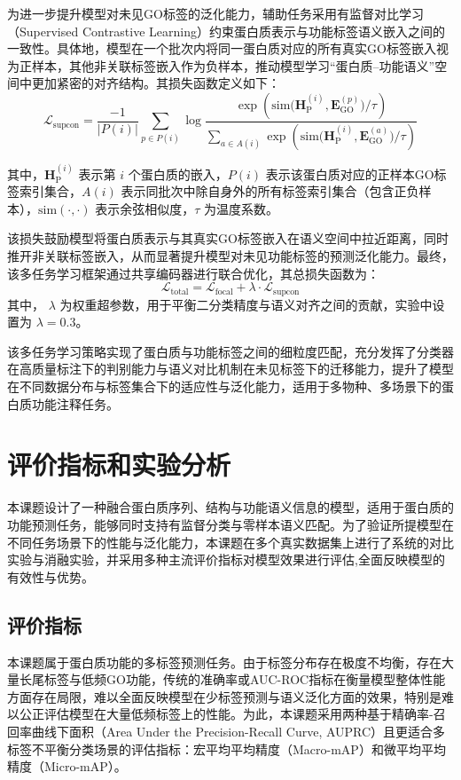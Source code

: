 为进一步提升模型对未见GO标签的泛化能力，辅助任务采用有监督对比学习（Supervised Contrastive Learning）约束蛋白质表示与功能标签语义嵌入之间的一致性。具体地，模型在一个批次内将同一蛋白质对应的所有真实GO标签嵌入视为正样本，其他非关联标签嵌入作为负样本，推动模型学习“蛋白质–功能语义”空间中更加紧密的对齐结构。其损失函数定义如下：
\begin{equation}
\mathcal{L}_{\mathrm{supcon}} = \frac{-1}{|P(i)|} \sum_{p \in P(i)} \log \frac{
    \exp\left(\mathrm{sim}\big(\mathbf{H}_{\mathrm{P}}^{(i)}, \mathbf{E}_{\mathrm{GO}}^{(p)}\big) / \tau\right)
}{
    \sum_{a \in A(i)} \exp\left(\mathrm{sim}\big(\mathbf{H}_{\mathrm{P}}^{(i)}, \mathbf{E}_{\mathrm{GO}}^{(a)}\big) / \tau\right)
}
\end{equation}

其中，\( \mathbf{H}_{\mathrm{P}}^{(i)} \) 表示第 \(i\) 个蛋白质的嵌入，\( P(i) \) 表示该蛋白质对应的正样本GO标签索引集合，\( A(i) \) 表示同批次中除自身外的所有标签索引集合（包含正负样本），\(\mathrm{sim}(\cdot,\cdot)\) 表示余弦相似度，\(\tau\) 为温度系数。

该损失鼓励模型将蛋白质表示与其真实GO标签嵌入在语义空间中拉近距离，同时推开非关联标签嵌入，从而显著提升模型对未见功能标签的预测泛化能力。最终，该多任务学习框架通过共享编码器进行联合优化，其总损失函数为：
\begin{equation}
\mathcal{L}_{\text{total}} = \mathcal{L}_{\text{focal}} + \lambda \cdot \mathcal{L}_{\text{supcon}}
\end{equation}
其中， $\lambda$ 为权重超参数，用于平衡二分类精度与语义对齐之间的贡献，实验中设置为 $\lambda=0.3$。

该多任务学习策略实现了蛋白质与功能标签之间的细粒度匹配，充分发挥了分类器在高质量标注下的判别能力与语义对比机制在未见标签下的迁移能力，提升了模型在不同数据分布与标签集合下的适应性与泛化能力，适用于多物种、多场景下的蛋白质功能注释任务。



\section{评价指标和实验分析}
本课题设计了一种融合蛋白质序列、结构与功能语义信息的模型，适用于蛋白质的功能预测任务，能够同时支持有监督分类与零样本语义匹配。为了验证所提模型在不同任务场景下的性能与泛化能力，本课题在多个真实数据集上进行了系统的对比实验与消融实验，并采用多种主流评价指标对模型效果进行评估,全面反映模型的有效性与优势。

\subsection{评价指标}
本课题属于蛋白质功能的多标签预测任务。由于标签分布存在极度不均衡，存在大量长尾标签与低频GO功能，传统的准确率或AUC-ROC指标在衡量模型整体性能方面存在局限，难以全面反映模型在少标签预测与语义泛化方面的效果，特别是难以公正评估模型在大量低频标签上的性能。为此，本课题采用两种基于精确率-召回率曲线下面积（Area Under the Precision-Recall Curve, AUPRC）且更适合多标签不平衡分类场景的评估指标：宏平均平均精度（Macro-mAP）和微平均平均精度（Micro-mAP）。


